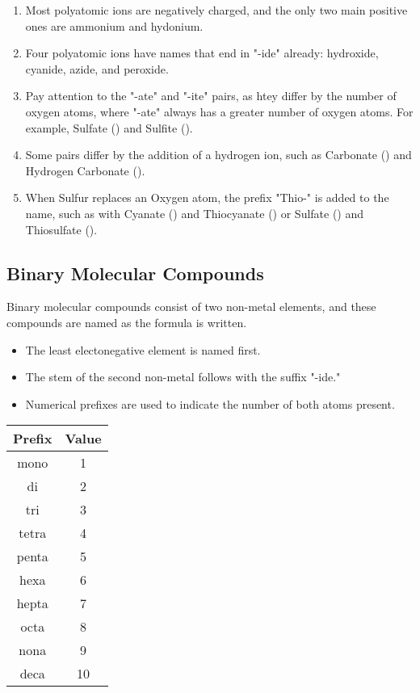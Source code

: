\begin{enumerate}
\item Most polyatomic ions are negatively charged, and the only two main positive ones are ammonium and hydonium.
\item Four polyatomic ions have names that end in "-ide" already: hydroxide, cyanide, azide, and peroxide.
\item Pay attention to the "-ate" and "-ite" pairs, as htey differ by the number of oxygen atoms, where "-ate" always has a greater number of oxygen atoms. For example, Sulfate () and Sulfite ().
\item Some pairs differ by the addition of a hydrogen ion, such as Carbonate () and Hydrogen Carbonate ().
\item When Sulfur replaces an Oxygen atom, the prefix "Thio-" is added to the name, such as with Cyanate () and Thiocyanate () or Sulfate () and Thiosulfate ().
\end{enumerate}

\subsection{Binary Molecular Compounds}

Binary molecular compounds consist of two non-metal elements, and these compounds are named as the formula is written.

\begin{itemize}
\item The least electonegative element is named first.
\item The stem of the second non-metal follows with the suffix "-ide."
\item Numerical prefixes are used to indicate the number of both atoms present.
\end{itemize}

\noindent
{}

\begin{table}[H]
\centering
\begin{tabular}{|c|c|}
\hline
\textbf{Prefix} & \textbf{Value} \\
\hline
mono & 1 \\
di & 2 \\
tri & 3 \\
tetra & 4 \\
penta & 5 \\
hexa & 6 \\
hepta & 7 \\
octa & 8 \\
nona & 9 \\
deca & 10 \\
\hline
\end{tabular}
\end{table}

